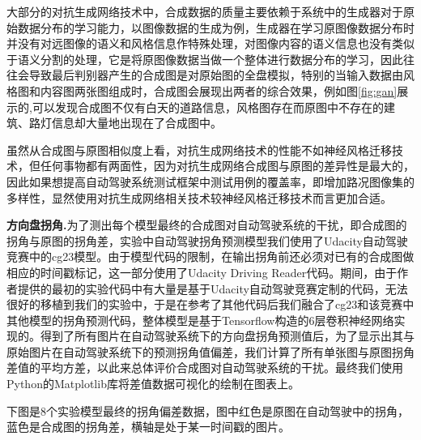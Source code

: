 大部分的对抗生成网络技术中，合成数据的质量主要依赖于系统中的生成器对于原始数据分布的学习能力，以图像数据的生成为例，生成器在学习原图像数据分布时并没有对远图像的语义和风格信息作特殊处理，对图像内容的语义信息也没有类似于语义分割的处理，它是将原图像数据当做一个整体进行数据分布的学习，因此往往会导致最后判别器产生的合成图是对原始图的全盘模拟，特别的当输入数据由风格图和内容图两张图组成时，合成图会展现出两者的综合效果，例如图\ref{fig:gan}展示的,可以发现合成图不仅有白天的道路信息，风格图存在而原图中不存在的建筑、路灯信息却大量地出现在了合成图中。

虽然从合成图与原图相似度上看，对抗生成网络技术的性能不如神经风格迁移技术，但任何事物都有两面性，因为对抗生成网络合成图与原图的差异性是最大的，因此如果想提高自动驾驶系统测试框架中测试用例的覆盖率，即增加路况图像集的多样性，显然使用对抗生成网络相关技术较神经风格迁移技术而言更加合适。

\textbf{方向盘拐角.}\quad 为了测出每个模型最终的合成图对自动驾驶系统的干扰，即合成图的拐角与原图的拐角差，实验中自动驾驶拐角预测模型我们使用了Udacity自动驾驶竞赛中的cg23\cite{cg23}模型。由于模型代码的限制，在输出拐角前还必须对已有的合成图做相应的时间戳标记，这一部分使用了Udacity Driving Reader代码\cite{git:udr}。期间，由于作者提供的最初的实验代码中有大量是基于Udacity自动驾驶竞赛定制的代码，无法很好的移植到我们的实验中，于是在参考了其他代码后我们融合了cg23和该竞赛中其他模型的拐角预测代码，整体模型是基于Tensorflow构造的6层卷积神经网络实现的。得到了所有图片在自动驾驶系统下的方向盘拐角预测值后，为了显示出其与原始图片在自动驾驶系统下的预测拐角值偏差，我们计算了所有单张图与原图拐角差值的平均方差，以此来总体评价合成图对自动驾驶系统的干扰。最终我们使用Python的Matplotlib库将差值数据可视化的绘制在图表上。

下图是8个实验模型最终的拐角偏差数据，图中红色是原图在自动驾驶中的拐角，蓝色是合成图的拐角差，横轴是处于某一时间戳的图片。

